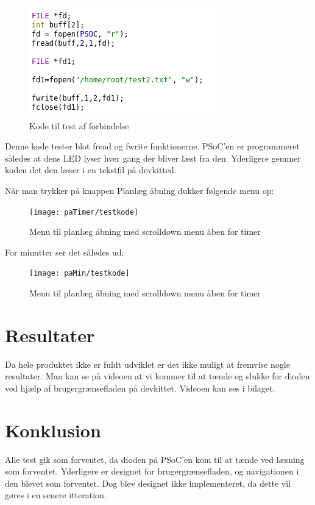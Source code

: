 \begin{figure}[H]
\includegraphics{Billeder/testkode}
\caption{Kode til test af forbindelse}
\end{figure}

Denne kode tester blot fread og fwrite funktionerne. PSoC'en er programmeret således at dens LED lyser hver gang der bliver læst fra den. Yderligere gemmer koden det den læser i en tekstfil på devkitted.

Når man trykker på knappen Planlæg åbning dukker følgende menu op:

\begin{figure}[H]
\texttt{[image: paTimer/testkode]}
\caption{Menu til planlæg åbning med scrolldown menu åben for timer}
\end{figure}

For minutter ser det således ud:

\begin{figure}[H]
\texttt{[image: paMin/testkode]}
\caption{Menu til planlæg åbning med scrolldown menu åben for timer}
\end{figure}

\section*{Resultater}

Da hele produktet ikke er fuldt udviklet er det ikke muligt at fremvise nogle resultater. Man kan se på videoen at vi kommer til at tænde og slukke for dioden ved hjælp af brugergrænsefladen på devkittet. Videoen kan ses i bilaget.

\section*{Konklusion}

Alle test gik som forventet, da dioden på PSoC'en kom til at tænde ved læsning som forventet. Yderligere er designet for brugergrænsefladen, og navigationen i den blevet som forventet. Dog blev designet ikke implementeret, da dette vil gøres i en senere itteration.